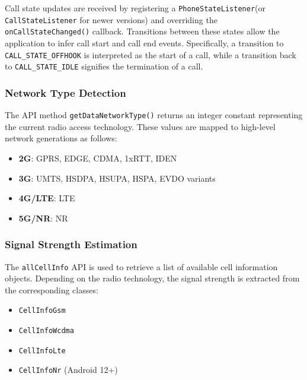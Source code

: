\documentclass{article}
\begin{document}
Call state updates are received by registering a \texttt{PhoneStateListener}(or \texttt{CallStateListener} for newer versions) and overriding the \texttt{onCallStateChanged()} callback. Transitions between these states allow the application to infer call start and call end events. Specifically, a transition to \texttt{CALL\_STATE\_OFFHOOK} is interpreted as the start of a call, while a transition back to \texttt{CALL\_STATE\_IDLE} signifies the termination of a call.




\subsubsection{Network Type Detection}

The API method \texttt{getDataNetworkType()} returns an integer constant representing the current radio access technology. These values are mapped to high-level network generations as follows:

\begin{itemize}
    \item \textbf{2G}: GPRS, EDGE, CDMA, 1xRTT, IDEN
    \item \textbf{3G}: UMTS, HSDPA, HSUPA, HSPA, EVDO variants
    \item \textbf{4G/LTE}: LTE
    \item \textbf{5G/NR}: NR
\end{itemize}


\subsubsection{Signal Strength Estimation}

The \texttt{allCellInfo} API is used to retrieve a list of available cell information objects. Depending on the radio technology, the signal strength is extracted from the corresponding classes:

\begin{itemize}
    \item \texttt{CellInfoGsm}
    \item \texttt{CellInfoWcdma}
    \item \texttt{CellInfoLte}
    \item \texttt{CellInfoNr} (Android 12+)
\end{itemize}
\end{document}
